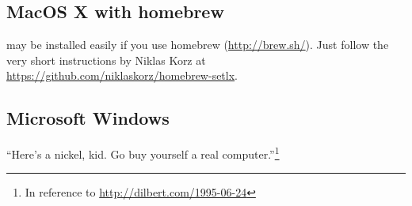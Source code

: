 \subsection{MacOS X with homebrew}\label{MacOsHomebrew}

\setlX{} may be installed easily if you use homebrew (\url{http://brew.sh/}). Just follow the very short instructions by Niklas Korz at \url{https://github.com/niklaskorz/homebrew-setlx}.

\subsection{Microsoft Windows}

\begin{center}
\large
``Here's a nickel, kid. Go buy yourself a real computer.''\footnote{In reference to \url{http://dilbert.com/1995-06-24}}
\end{center}


